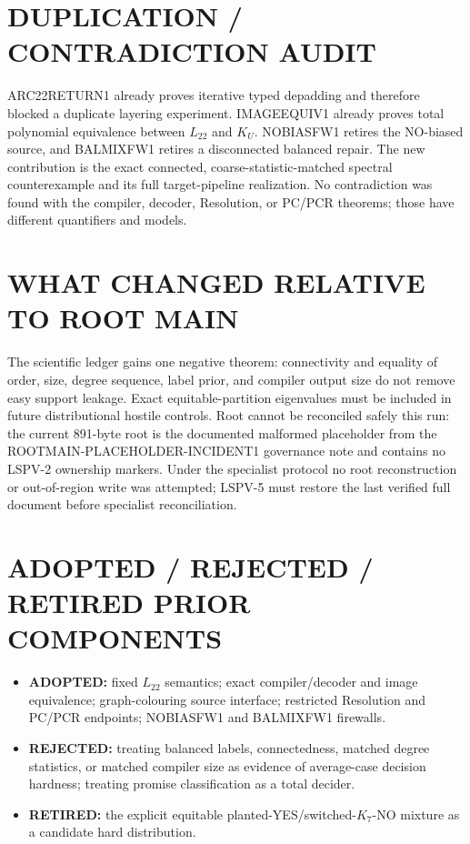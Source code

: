 \documentclass[11pt]{article}
\newcommand{\Ltwo}{L_{22}}
\newcommand{\KU}{K_U}
\begin{document}
\section{DUPLICATION / CONTRADICTION AUDIT}
ARC22RETURN1 already proves iterative typed depadding and therefore blocked a
duplicate layering experiment.  IMAGEEQUIV1 already proves total polynomial
equivalence between $\Ltwo$ and $\KU$.  NOBIASFW1 retires the NO-biased source,
and BALMIXFW1 retires a disconnected balanced repair.  The new contribution is
the exact connected, coarse-statistic-matched spectral counterexample and its
full target-pipeline realization.  No contradiction was found with the
compiler, decoder, Resolution, or PC/PCR theorems; those have different
quantifiers and models.

\section{WHAT CHANGED RELATIVE TO ROOT MAIN}
The scientific ledger gains one negative theorem: connectivity and equality of
order, size, degree sequence, label prior, and compiler output size do not
remove easy support leakage.  Exact equitable-partition eigenvalues must be
included in future distributional hostile controls.  Root 
cannot be reconciled safely this run: the current 891-byte root is the
documented malformed placeholder from the ROOTMAIN-PLACEHOLDER-INCIDENT1
governance note and contains no LSPV-2 ownership markers.  Under the specialist
protocol no root reconstruction or out-of-region write was attempted; LSPV-5
must restore the last verified full document before specialist reconciliation.

\section{ADOPTED / REJECTED / RETIRED PRIOR COMPONENTS}
\begin{itemize}
\item \textbf{ADOPTED:} fixed $\Ltwo$ semantics; exact compiler/decoder and
  image equivalence; graph-colouring source interface; restricted
  Resolution and PC/PCR endpoints; NOBIASFW1 and BALMIXFW1 firewalls.
\item \textbf{REJECTED:} treating balanced labels, connectedness, matched
  degree statistics, or matched compiler size as evidence of average-case
  decision hardness; treating promise classification as a total decider.
\item \textbf{RETIRED:} the explicit equitable planted-YES/switched-$K_7$-NO
  mixture as a candidate hard distribution.
\end{itemize}
\end{document}
